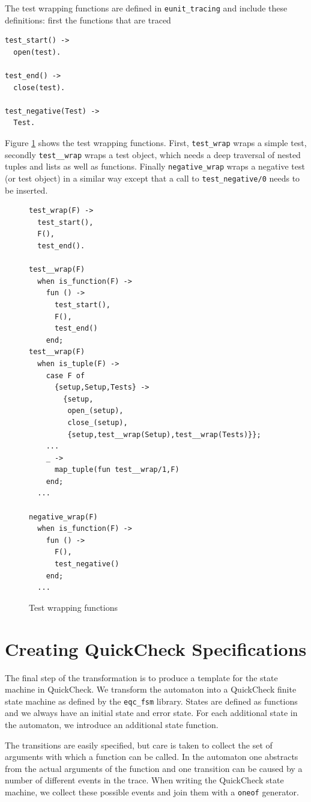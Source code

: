 \documentclass[]{sigplanconf}
\begin{document}
The test wrapping functions are defined in \texttt{eunit\_tracing} and include these definitions: first the functions that are traced
\begin{verbatim}
test_start() ->
  open(test).

test_end() ->
  close(test).

test_negative(Test) ->
  Test.
\end{verbatim}
Figure \ref{wrapping} shows the test wrapping functions. First, \verb+test_wrap+ wraps a simple test, secondly \verb+test__wrap+ wraps a test object, which needs a deep traversal of nested tuples and lists as well as functions. Finally \verb+negative_wrap+ wraps a negative test (or test object) in a similar way except that a call to \texttt{test\_negative/0} needs to be inserted.
\begin{figure}
\begin{verbatim}
test_wrap(F) ->
  test_start(),
  F(),
  test_end().

test__wrap(F)
  when is_function(F) ->
    fun () ->
      test_start(),
      F(),
      test_end()
    end;  
test__wrap(F)
  when is_tuple(F) ->
    case F of
      {setup,Setup,Tests} ->
        {setup,
         open_(setup),
         close_(setup),
         {setup,test__wrap(Setup),test__wrap(Tests)}};
    ...
    _ ->   
      map_tuple(fun test__wrap/1,F)
    end;
  ...

negative_wrap(F)
  when is_function(F) ->
    fun () ->
      F(),
      test_negative()
    end;  
  ...
\end{verbatim}
\caption{Test wrapping functions}
\label{wrapping}
\end{figure}

\section{Creating QuickCheck Specifications}
\label{ToQC}

The final step of the transformation is to produce a template for the state machine in QuickCheck. We transform the automaton into a QuickCheck finite state machine as defined by the \verb+eqc_fsm+ library. States are defined as functions and we always have an initial state and error state. For each additional state in the automaton, we introduce an additional state function.

The transitions are easily specified, but care is taken to collect the set of arguments with which a function can be called. In the automaton one abstracts from the actual arguments of the function and one transition can be caused by a number of different events in the trace. When writing the QuickCheck state machine, we collect these possible events and join them with a \verb+oneof+ generator. 
\end{document}
